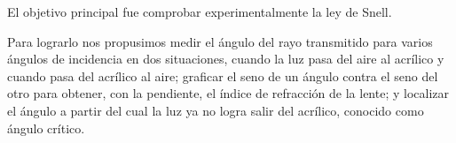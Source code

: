 El objetivo principal fue comprobar experimentalmente la ley de Snell.

Para lograrlo nos propusimos medir el ángulo del rayo transmitido para varios ángulos de incidencia en dos situaciones, cuando la luz pasa del aire al acrílico y cuando pasa del acrílico al aire; graficar el seno de un ángulo contra el seno del otro para obtener, con la pendiente, el índice de refracción de la lente; y localizar el ángulo a partir del cual la luz ya no logra salir del acrílico, conocido como ángulo crítico.
